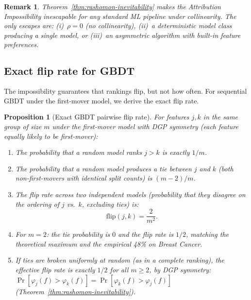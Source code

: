 \documentclass{article}
\newtheorem{proposition}[theorem]{Proposition}
\newtheorem{remark}[theorem]{Remark}
\begin{document}
\begin{remark}
Theorem~\ref{thm:rashomon-inevitability} makes the Attribution
Impossibility inescapable for any standard ML pipeline under
collinearity. The only escapes are: (i)~$\rho = 0$ (no collinearity),
(ii)~a deterministic model class producing a single model, or
(iii)~an asymmetric algorithm with built-in feature preferences.
\end{remark}

\subsection{Exact flip rate for GBDT}

The impossibility guarantees that rankings flip, but not how often.
For sequential GBDT under the first-mover model, we derive the exact
flip rate.

\begin{proposition}[Exact GBDT pairwise flip rate]
\label{prop:exact-flip}
For features $j, k$ in the same group of size $m$ under the first-mover
model with DGP symmetry (each feature equally likely to be first-mover):
\begin{enumerate}
    \item[(i)] The probability that a random model ranks $j > k$ is exactly $1/m$.
    \item[(ii)] The probability that a random model produces a tie between $j$ and $k$
      (both non-first-movers with identical split counts) is $(m-2)/m$.
    \item[(iii)] The flip rate across two independent models (probability that they
      disagree on the ordering of $j$ vs.\ $k$, excluding ties) is:
      \[
          \text{flip}(j,k) = \frac{2}{m^2}.
      \]
    \item[(iv)] For $m = 2$: the tie probability is $0$ and
      the flip rate is $1/2$, matching the theoretical maximum and the
      empirical 48\% on Breast Cancer.
    \item[(v)] If ties are broken uniformly at random (as in a complete ranking),
      the effective flip rate is exactly $1/2$ for all $m \geq 2$,
      by DGP symmetry: $\Pr[\varphi_j(f) > \varphi_k(f)] =
      \Pr[\varphi_k(f) > \varphi_j(f)]$ (Theorem~\ref{thm:rashomon-inevitability}).
\end{enumerate}
\end{proposition}
\end{document}
